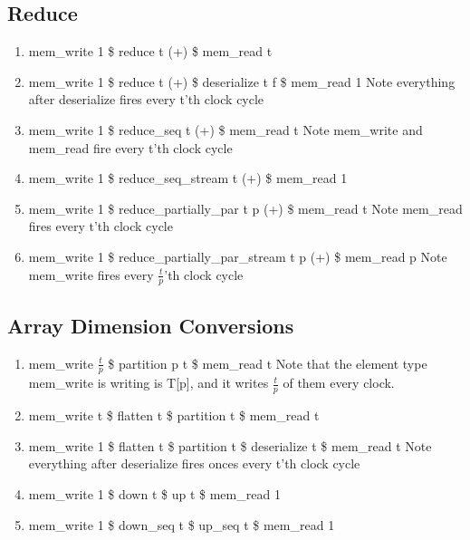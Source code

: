 \documentclass[11pt,fleqn]{article}
\numberwithin{equation}{subsection}
\begin{document}
\subsection{Reduce}
\begin{enumerate}
    \item mem\_write 1 \$ reduce t (+) \$ mem\_read t
    \item mem\_write 1 \$ reduce t (+) \$ deserialize t f \$ mem\_read 1 
        \subitem Note everything after deserialize fires every t'th clock cycle
    \item mem\_write 1 \$ reduce\_seq t (+) \$ mem\_read t
        \subitem Note mem\_write and mem\_read fire every t'th clock cycle
    \item mem\_write 1 \$ reduce\_seq\_stream t (+) \$ mem\_read 1
    \item mem\_write 1 \$ reduce\_partially\_par t p (+) \$ mem\_read t
        \subitem Note mem\_read fires every t'th clock cycle
    \item mem\_write 1 \$ reduce\_partially\_par\_stream t p (+) \$ mem\_read p
        \subitem Note mem\_write fires every $\frac{t}{p}$'th clock cycle
\end{enumerate}

\subsection{Array Dimension Conversions}
\begin{enumerate}
    \item mem\_write $\frac{t}{p}$ \$ partition p t \$ mem\_read t
        \subitem Note that the element type mem\_write is writing is T[p], 
        and it writes $\frac{t}{p}$ of them every clock.
    \item mem\_write t \$ flatten t \$ partition t \$ mem\_read t 
    \item mem\_write 1 \$ flatten t \$ partition t \$ deserialize t \$ mem\_read t
        \subitem Note everything after deserialize fires onces every t'th 
        clock cycle
    \item mem\_write 1 \$ down t \$ up t \$ mem\_read 1
    \item mem\_write 1 \$ down\_seq t \$ up\_seq t \$ mem\_read 1
\end{enumerate}
\end{document}
